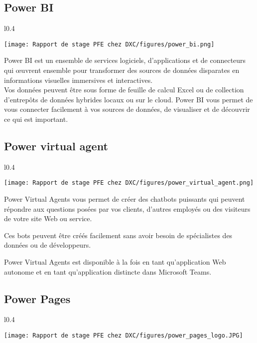 \subsection{Power BI }

\begin{wrapfigure}{l}{0.4\textwidth}
  \begin{center}
    \texttt{[image: Rapport de stage PFE chez DXC/figures/power\_bi.png]}
  \end{center}
\end{wrapfigure}

Power BI est un ensemble de services logiciels, d’applications et de connecteurs qui œuvrent ensemble pour transformer des sources de données disparates en informations visuelles immersives et interactives. 
\\
Vos données peuvent être sous forme de feuille de calcul Excel ou de collection d’entrepôts de données hybrides locaux ou sur le cloud. Power BI vous permet de vous connecter facilement à vos sources de données, de visualiser et de découvrir ce qui est important.

\subsection{Power virtual agent }

\begin{wrapfigure}{l}{0.4\textwidth}
  \begin{center}
    \texttt{[image: Rapport de stage PFE chez DXC/figures/power\_virtual\_agent.png]}
  \end{center}
\end{wrapfigure}

Power Virtual Agents vous permet de créer des chatbots puissants qui peuvent répondre aux questions posées par vos clients, d’autres employés ou des visiteurs de votre site Web ou service.

Ces bots peuvent être créés facilement sans avoir besoin de spécialistes des données ou de développeurs.

Power Virtual Agents est disponible à la fois en tant qu’application Web autonome et en tant qu’application distincte dans Microsoft Teams.

\subsection{Power Pages}

\begin{wrapfigure}{l}{0.4\textwidth}
  \begin{center}
    \texttt{[image: Rapport de stage PFE chez DXC/figures/power\_pages\_logo.JPG]}
  \end{center}
\end{wrapfigure}

